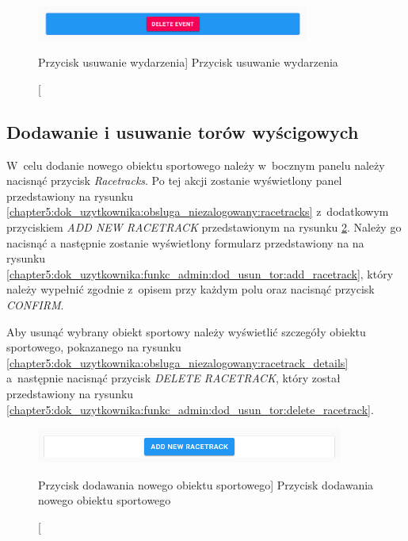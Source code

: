 \documentclass[../Kamil_Kowalewski_Main.tex]{subfiles}
\begin{document}
{{{            \begin{figure}[H]
                \centering
                \includegraphics[width=0.8\textwidth, keepaspectratio]
                {img/chapter5/admin/remove_event_button.png}
                \caption
                [Przycisk usuwanie wydarzenia]
                {Przycisk usuwanie wydarzenia}
                \label{chapter5:dok_uzytkownika:funkc_admin:usun_wydarzenie:remove_event_button}
            \end{figure}
        }

        \subsection{Dodawanie i usuwanie torów wyścigowych}
        \label{chapter5:dok_uzytkownika:funkc_admin:dod_usun_tor} {
            W~celu dodanie nowego obiektu sportowego należy w~bocznym panelu należy
            nacisnąć przycisk \textit{Racetracks}. Po tej akcji zostanie wyświetlony
            panel przedstawiony na rysunku
            \ref{chapter5:dok_uzytkownika:obsluga_niezalogowany:racetracks}
            z~dodatkowym przyciskiem \textit{ADD NEW RACETRACK} przedstawionym na rysunku
            \ref{chapter5:dok_uzytkownika:funkc_admin:dod_usun_tor:new_racetrack_button}.
            Należy go nacisnąć a następnie zostanie wyświetlony formularz przedstawiony na
            na rysunku
            \ref{chapter5:dok_uzytkownika:funkc_admin:dod_usun_tor:add_racetrack},
            który należy wypełnić zgodnie z~opisem przy każdym polu oraz nacisnąć przycisk
            \textit{CONFIRM}.

            Aby usunąć wybrany obiekt sportowy należy wyświetlić szczegóły obiektu
            sportowego, pokazanego na rysunku
            \ref{chapter5:dok_uzytkownika:obsluga_niezalogowany:racetrack_details}
            a~następnie nacisnąć przycisk \textit{DELETE RACETRACK}, który został
            przedstawiony na rysunku
            \ref{chapter5:dok_uzytkownika:funkc_admin:dod_usun_tor:delete_racetrack}.

            \begin{figure}[H]
                \centering
                \includegraphics[width=0.9\textwidth, keepaspectratio]
                {img/chapter5/admin/new_racetrack_button.png}
                \caption
                [Przycisk dodawania nowego obiektu sportowego]
                {Przycisk dodawania nowego obiektu sportowego}
                \label{chapter5:dok_uzytkownika:funkc_admin:dod_usun_tor:new_racetrack_button}
            \end{figure}

}}}
\end{document}
